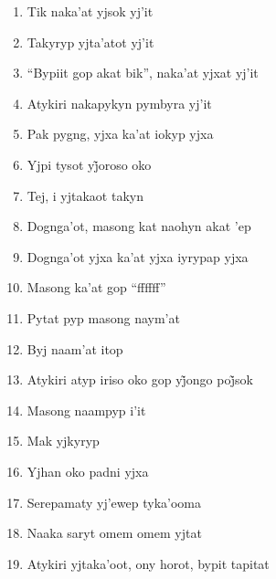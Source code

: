 \begin{enumerate}
 \begin{center}\end{center}
 
 \item Tik naka'at yjsok yj'it
 \item Takyryp yjta'atot yj'it
 \item ``Bypiit gop akat bik'', naka'at yjxat yj'it
 \item Atykiri nakapykyn pymbyra yj'it
 
 \begin{center}\end{center}
 
 \item Pak pygng, yjxa ka'at iokyp yjxa
 \item Yjpi tysot yj̃oroso oko
 \item Tej, i yjtakaot takyn
 \item Dognga'ot, masong kat naohyn akat 'ep
 \item Dognga'ot yjxa ka'at yjxa iyrypap yjxa
 
 \begin{center}\end{center}
 
 \item Masong ka'at gop ``ffffff''
 \item Pytat pyp masong naym'at
 \item Byj naam'at itop
 \item Atykiri atyp iriso oko gop yj̃ongo poj̃sok
 \item Masong naampyp i'it
 \item Mak yjkyryp
 \item Yjhan oko padni yjxa
 
 \begin{center}\end{center}
 
 \item Serepamaty yj'ewep tyka'ooma
 \item Naaka saryt omem omem yjtat
 \item Atykiri yjtaka'oot, ony horot, bypit tapitat
 
 \begin{center}\end{center}
 

\end{enumerate}
